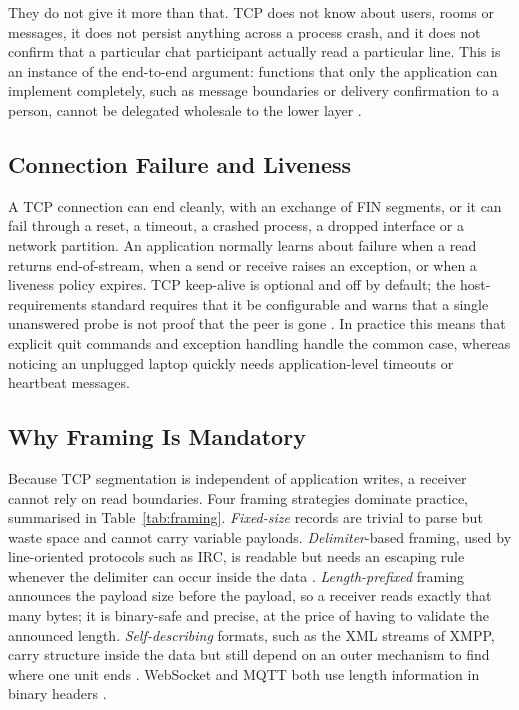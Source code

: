 \documentclass[conference]{IEEEtran}
\begin{document}
They do not give it more than that. TCP does not know about users, rooms or messages, it does not persist anything across a process crash, and it does not confirm that a particular chat participant actually read a particular line. This is an instance of the end-to-end argument: functions that only the application can implement completely, such as message boundaries or delivery confirmation to a person, cannot be delegated wholesale to the lower layer \cite{saltzer}.

\subsection{Connection Failure and Liveness}
A TCP connection can end cleanly, with an exchange of FIN segments, or it can fail through a reset, a timeout, a crashed process, a dropped interface or a network partition. An application normally learns about failure when a read returns end-of-stream, when a send or receive raises an exception, or when a liveness policy expires. TCP keep-alive is optional and off by default; the host-requirements standard requires that it be configurable and warns that a single unanswered probe is not proof that the peer is gone \cite{rfc1122}. In practice this means that explicit quit commands and exception handling handle the common case, whereas noticing an unplugged laptop quickly needs application-level timeouts or heartbeat messages.

\subsection{Why Framing Is Mandatory}
Because TCP segmentation is independent of application writes, a receiver cannot rely on read boundaries. Four framing strategies dominate practice, summarised in Table~\ref{tab:framing}. \emph{Fixed-size} records are trivial to parse but waste space and cannot carry variable payloads. \emph{Delimiter}-based framing, used by line-oriented protocols such as IRC, is readable but needs an escaping rule whenever the delimiter can occur inside the data \cite{rfc1459}. \emph{Length-prefixed} framing announces the payload size before the payload, so a receiver reads exactly that many bytes; it is binary-safe and precise, at the price of having to validate the announced length. \emph{Self-describing} formats, such as the XML streams of XMPP, carry structure inside the data but still depend on an outer mechanism to find where one unit ends \cite{rfc6120}. WebSocket and MQTT both use length information in binary headers \cite{rfc6455,mqtt5}.
\end{document}
